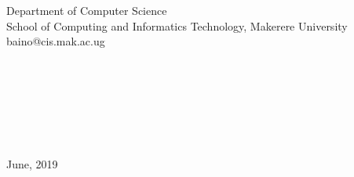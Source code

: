 \begin{titlepage}
\begin{center}
Department of Computer Science\\
School of Computing and Informatics Technology, Makerere University\\
baino@cis.mak.ac.ug\\~\\~\\~\\~\\~\\~\\~\\
June, 2019


\end{center}


\end{titlepage}